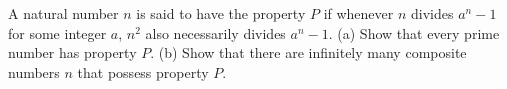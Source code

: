 A natural number $n$ is said to have the property $P$ if whenever $n$ divides $a^{n}-1$ for some integer $a$, $n^{2}$ also necessarily divides $a^{n}-1$.
(a) Show that every prime number has property $P$.
(b) Show that there are infinitely many composite numbers $n$ that possess property $P$.
